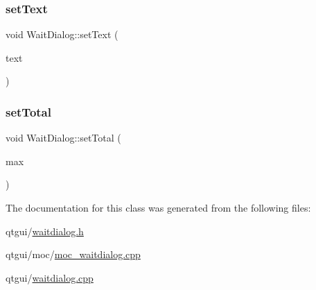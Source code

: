 \subsubsection{\texorpdfstring{setText}{setText}}
{\footnotesize\ttfamily void Wait\+Dialog\+::set\+Text (\begin{DoxyParamCaption}\item[{Q\+String}]{text }\end{DoxyParamCaption})\hspace{0.3cm}{\ttfamily [slot]}}

\mbox{\label{class_wait_dialog_a40523d825231c1b8838389618026ab87}} 
\subsubsection{\texorpdfstring{setTotal}{setTotal}}
{\footnotesize\ttfamily void Wait\+Dialog\+::set\+Total (\begin{DoxyParamCaption}\item[{int}]{max }\end{DoxyParamCaption})\hspace{0.3cm}{\ttfamily [slot]}}



The documentation for this class was generated from the following files\+:\begin{DoxyCompactItemize}
\item 
qtgui/\mbox{\hyperlink{waitdialog_8h}{waitdialog.\+h}}\item 
qtgui/moc/\mbox{\hyperlink{moc__waitdialog_8cpp}{moc\+\_\+waitdialog.\+cpp}}\item 
qtgui/\mbox{\hyperlink{waitdialog_8cpp}{waitdialog.\+cpp}}\end{DoxyCompactItemize}
